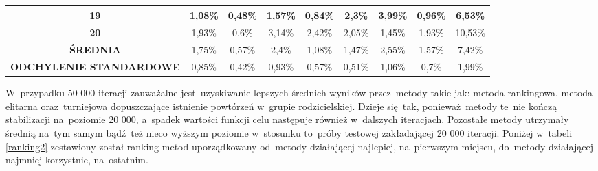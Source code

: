\begin{table}[h!]
\begin{center}
{\begin{tabular}{|c|c|c|c|c|c|c|c|c|}
\hline
 \textbf{19}&1,08\%&0,48\%&1,57\%&0,84\%&2,3\%&3,99\%&0,96\%&6,53\%\\
\hline
 \textbf{20}&1,93\%&0,6\%&3,14\%&2,42\%&2,05\%&1,45\%&1,93\%&10,53\%\\
\hline
 \textbf{ŚREDNIA}&1,75\%&0,57\%&2,4\%&1,08\%&1,47\%&2,55\%&1,57\%&7,42\%\\
\hline
 \textbf{ODCHYLENIE STANDARDOWE}&0,85\%&0,42\%&0,93\%&0,57\%&0,51\%&1,06\%&0,7\%&1,99\%\\
\hline
\end{tabular}}
\label{instancja2}
\end{center}
\end{table}

W~przypadku 50 000 iteracji zauważalne jest~uzyskiwanie lepszych średnich wyników przez~metody takie jak: metoda rankingowa, metoda elitarna oraz~turniejowa dopuszczające istnienie powtórzeń w~grupie rodzicielskiej. Dzieje się~tak, ponieważ~metody te~nie kończą stabilizacji na~poziomie 20 000, a~spadek wartości funkcji celu następuje również w~dalszych iteracjach. Pozostałe metody utrzymały średnią na~tym samym bądź~też nieco wyższym poziomie w~stosunku to~próby testowej zakładającej 20 000 iteracji. Poniżej w~tabeli \ref{ranking2} zestawiony został ranking metod uporządkowany od~metody działającej najlepiej, na~pierwszym miejscu, do~metody działającej najmniej korzystnie, na~ostatnim.

\begin{table}[h!]
\begin{center}
\caption{Ranking metod reprodukcji na podstawie średniej wartości błędu względnego funkcji celu, 50 000 iteracji.}
\label{ranking2}
\end{center}
\end{table}

